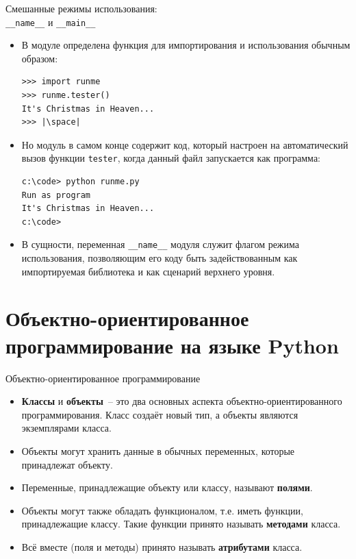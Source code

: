\documentclass[aspectratio=169, mathserif]{beamer}	%
\begin{document}
\begin{frame}[fragile]{Смешанные режимы использования:  \\ \texttt{\_\_name\_\_} и \texttt{\_\_main\_\_}}
\scriptsize
\begin{itemize}
	\item В модуле определена функция для импортирования и использования обычным образом:
\vfill
\begin{verbatim}
>>> import runme
>>> runme.tester()
It's Christmas in Heaven...
>>> |\space|
\end{verbatim}
\vfill
\item Но модуль в самом конце содержит код, который настроен на автоматический вызов функции \texttt{tester}, когда данный файл запускается как программа:
\vfill
\begin{verbatim}
c:\code> python runme.py
Run as program
It's Christmas in Heaven...
c:\code>
\end{verbatim}
\vfill
\item В сущности, переменная \texttt{\_\_name\_\_} модуля служит флагом режима использования, позволяющим его коду быть задействованным как импортируемая библиотека и как сценарий верхнего уровня.
\end{itemize}
\vfill
\end{frame}

\section{Объектно-ориентированное \\ программирование на языке Python}
\sectionframe

\begin{frame}[fragile]{Объектно-ориентированное программирование}
\scriptsize
\begin{itemize}
	\item \textcolor{tpugreen}{\textbf{Классы}} и \textcolor{tpugreen}{\textbf{объекты}}~-- это два основных аспекта объектно-ориентированного программирования. Класс создаёт новый тип, а объекты являются экземплярами класса.
	\item Объекты могут хранить данные в обычных переменных, которые принадлежат объекту.
	\item Переменные, принадлежащие объекту или классу, называют \textcolor{extraorange}{\textbf{полями}}.
	\item Объекты могут также обладать функционалом, т.е. иметь функции, принадлежащие классу. Такие функции принято называть \textcolor{extraorange}{\textbf{методами}} класса.
	\item Всё вместе (поля и методы) принято называть \textcolor{extraorange}{\textbf{атрибутами}} класса.
\end{itemize}
\vfill
\end{frame}
\end{document}
